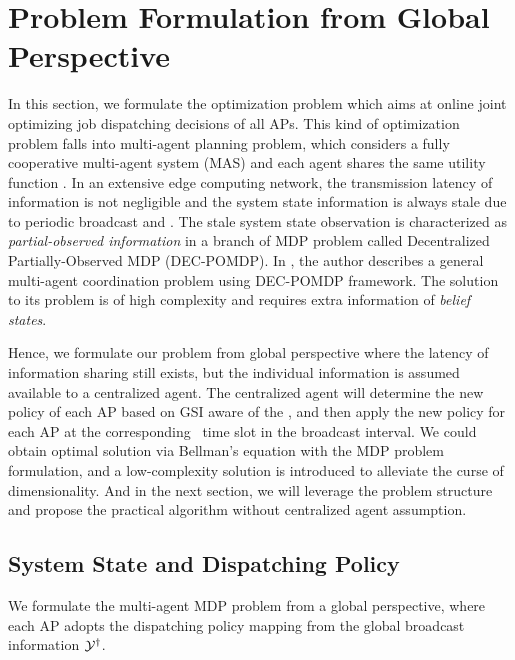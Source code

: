 \section{Problem Formulation from Global Perspective}
In this section, we formulate the optimization problem which aims at online joint optimizing job dispatching decisions of all APs.
This kind of optimization problem falls into multi-agent planning problem, which considers a fully cooperative multi-agent system (MAS) and each agent shares the same utility function .
In an extensive edge computing network, the transmission latency of information is not negligible and the system state information is always stale due to periodic broadcast and \brlatency.
The stale system state observation is characterized as \emph{partial-observed information} in a branch of MDP problem called Decentralized Partially-Observed MDP (DEC-POMDP).
In , the author describes a general multi-agent coordination problem using DEC-POMDP framework. The solution to its problem is of high complexity and requires extra information of \emph{belief states}.

Hence, we formulate our problem from global perspective where the latency of information sharing still exists, but the individual information is assumed available to a centralized agent.
The centralized agent will determine the new policy of each AP based on GSI aware of the \brlatency, and then apply the new policy for each AP at the corresponding \brlatency~time slot in the broadcast interval.
We could obtain optimal solution via Bellman's equation with the MDP problem formulation, and  a low-complexity solution is introduced to alleviate the curse of dimensionality.
And in the next section, we will leverage the problem structure and propose the practical algorithm without centralized agent assumption.


\subsection{System State and Dispatching Policy}
We formulate the multi-agent MDP problem from a global perspective, where each AP adopts the dispatching policy mapping from the global broadcast information $\mathcal{Y}^{\dagger}$.

